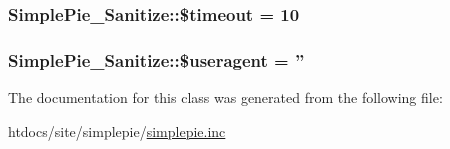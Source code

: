 \hypertarget{class_simple_pie___sanitize_a9aba7779936d3f24347da7871755a7d2}{
\subsubsection[{\$timeout}]{\setlength{\rightskip}{0pt plus 5cm}Simple\-Pie\-\_\-\-Sanitize\-::\$timeout = 10}}\label{class_simple_pie___sanitize_a9aba7779936d3f24347da7871755a7d2}
\hypertarget{class_simple_pie___sanitize_a3164462324ed85ec9bae689e3d85e5d3}{
\subsubsection[{\$useragent}]{\setlength{\rightskip}{0pt plus 5cm}Simple\-Pie\-\_\-\-Sanitize\-::\$useragent = ''}}\label{class_simple_pie___sanitize_a3164462324ed85ec9bae689e3d85e5d3}


The documentation for this class was generated from the following file\-:\begin{DoxyCompactItemize}
\item 
htdocs/site/simplepie/\hyperlink{simplepie_8inc}{simplepie.\-inc}\end{DoxyCompactItemize}
